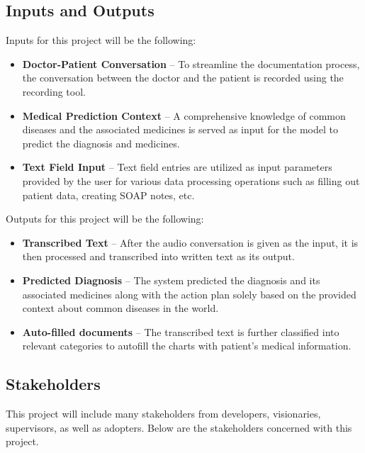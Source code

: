 \documentclass{article}
\begin{document}
\subsection{Inputs and Outputs}
Inputs for this project will be the following:

\begin{itemize}
    \item \textbf{Doctor-Patient Conversation} -- To streamline the documentation process, the conversation between the doctor and the patient is recorded using the recording tool.
    \item \textbf{Medical Prediction Context} -- A comprehensive knowledge of common diseases and the associated medicines is served as input for the model to predict the diagnosis and medicines.
    \item \textbf{Text Field Input} -- Text field entries are utilized as input parameters provided by the user for various data processing operations such as filling out patient data, creating SOAP notes, etc.
     
\end {itemize}

Outputs for this project will be the following: 

\begin{itemize} 
    \item \textbf{Transcribed Text} -- After the audio conversation is given as the input, it is then processed and transcribed into written text as its output.
    \item \textbf{Predicted Diagnosis} -- The system predicted the diagnosis and its associated medicines along with the action plan solely based on the provided context about common diseases in the world.  
    \item \textbf{Auto-filled documents} -- The transcribed text is further classified into relevant categories to autofill the charts with patient's medical information.
\end{itemize}


\subsection{Stakeholders}

This project will include many stakeholders from developers, visionaries, supervisors, as well as adopters. Below are the stakeholders concerned with this project.
\end{document}
